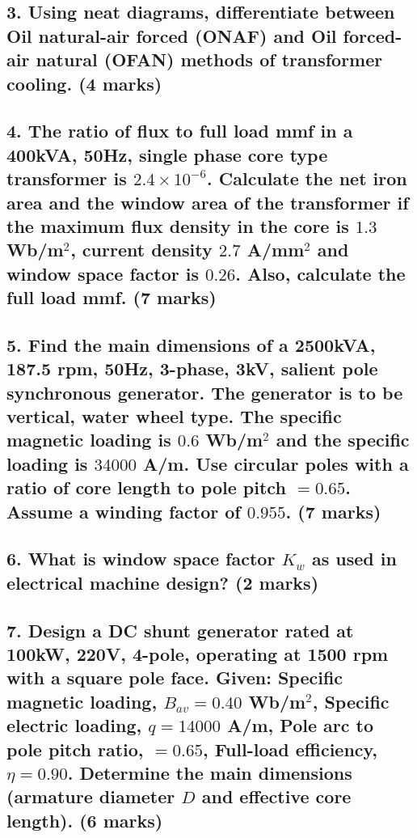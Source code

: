 \documentclass[12pt]{article}
\begin{document}
\subsection*{\textbf{3.} Using neat diagrams, differentiate between Oil natural-air forced (ONAF) and Oil forced-air natural (OFAN) methods of transformer cooling. \textbf{(4 marks)}}

\subsection*{\textbf{4.} The ratio of flux to full load mmf in a 400kVA, 50Hz, single phase core type transformer is $2.4 \times 10^{-6}$. Calculate the net iron area and the window area of the transformer if the maximum flux density in the core is $1.3$ Wb/m$^2$, current density $2.7$ A/mm$^2$ and window space factor is $0.26$. Also, calculate the full load mmf. \textbf{(7 marks)}}

\subsection*{\textbf{5.} Find the main dimensions of a 2500kVA, 187.5 rpm, 50Hz, 3-phase, 3kV, salient pole synchronous generator. The generator is to be vertical, water wheel type. The specific magnetic loading is $0.6$ Wb/m$^2$ and the specific loading is $34000$ A/m. Use circular poles with a ratio of core length to pole pitch $= 0.65$. Assume a winding factor of $0.955$. \textbf{(7 marks)}}

\subsection*{\textbf{6.} What is window space factor $K_w$ as used in electrical machine design? \textbf{(2 marks)}}

\subsection*{\textbf{7.} Design a DC shunt generator rated at 100kW, 220V, 4-pole, operating at 1500 rpm with a square pole face. Given: Specific magnetic loading, $B_{av} = 0.40$ Wb/m$^2$, Specific electric loading, $q = 14000$ A/m, Pole arc to pole pitch ratio, $= 0.65$, Full-load efficiency, $\eta = 0.90$. Determine the main dimensions (armature diameter $D$ and effective core length). \textbf{(6 marks)}}
\end{document}

